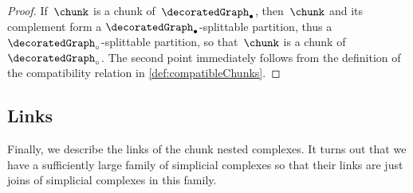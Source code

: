 \documentclass{amsart}
\theoremstyle{definition}
\begin{document}
\begin{proof}
  If~$\chunk$ is a chunk of~$\decoratedGraph_\bullet$, then~$\chunk$ and its complement form a $\decoratedGraph_\bullet$-splittable partition, thus a $\decoratedGraph_\circ$-splittable partition, so that~$\chunk$ is a chunk of~$\decoratedGraph_\circ$.
  The second point immediately follows from the definition of the compatibility relation in \cref{def:compatibleChunks}.
\end{proof}


\subsection{Links}
\label{subsec:links}

Finally, we describe the links of the chunk nested complexes.
It turns out that we have a sufficiently large family of simplicial complexes so that their links are just joins of simplicial complexes in this family.
\end{document}
